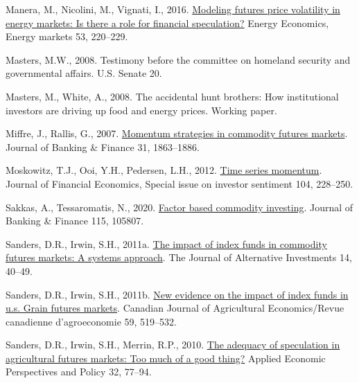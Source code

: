 \documentclass[]{elsarticle} %
\newlength{\cslhangindent}
\newlength{\cslentryspacingunit} %
\newenvironment{CSLReferences}[2] %
 {%
  \setlength{\parindent}{0pt}
  \ifodd #1
  \let\oldpar\par
  \def\par{\hangindent=\cslhangindent\oldpar}
  \fi
  \setlength{\parskip}{#2\cslentryspacingunit}
 }%
 {}
\begin{document}
\begin{CSLReferences}{1}{0}
\leavevmode{}%
Manera, M., Nicolini, M., Vignati, I., 2016. \href{https://doi.org/10.1016/j.eneco.2014.07.001}{Modeling futures price volatility in energy markets: Is there a role for financial speculation?} Energy Economics, Energy markets 53, 220--229.

\leavevmode{}%
Masters, M.W., 2008. Testimony before the committee on homeland security and governmental affairs. U.S. Senate 20.

\leavevmode{}%
Masters, M., White, A., 2008. The accidental hunt brothers: How institutional investors are driving up food and energy prices. Working paper.

\leavevmode{}%
Miffre, J., Rallis, G., 2007. \href{https://doi.org/10.1016/j.jbankfin.2006.12.005}{Momentum strategies in commodity futures markets}. Journal of Banking \& Finance 31, 1863--1886.

\leavevmode{}%
Moskowitz, T.J., Ooi, Y.H., Pedersen, L.H., 2012. \href{https://doi.org/10.1016/j.jfineco.2011.11.003}{Time series momentum}. Journal of Financial Economics, Special issue on investor sentiment 104, 228--250.

\leavevmode{}%
Sakkas, A., Tessaromatis, N., 2020. \href{https://doi.org/10.1016/j.jbankfin.2020.105807}{Factor based commodity investing}. Journal of Banking \& Finance 115, 105807.

\leavevmode{}%
Sanders, D.R., Irwin, S.H., 2011a. \href{https://doi.org/10.3905/jai.2011.14.1.040}{The impact of index funds in commodity futures markets: A systems approach}. The Journal of Alternative Investments 14, 40--49.

\leavevmode{}%
Sanders, D.R., Irwin, S.H., 2011b. \href{https://doi.org/10.1111/j.1744-7976.2011.01226.x}{New evidence on the impact of index funds in u.s. Grain futures markets}. Canadian Journal of Agricultural Economics/Revue canadienne d'agroeconomie 59, 519--532.

\leavevmode{}%
Sanders, D.R., Irwin, S.H., Merrin, R.P., 2010. \href{https://doi.org/10.1093/aepp/ppp006}{The adequacy of speculation in agricultural futures markets: Too much of a good thing?} Applied Economic Perspectives and Policy 32, 77--94.


\end{CSLReferences}
\end{document}
